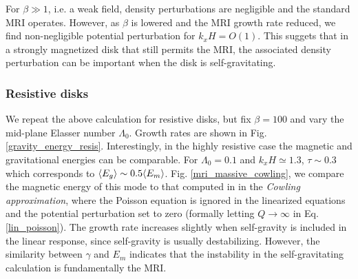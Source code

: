 For $\beta\gg 1$, i.e. a weak field, density perturbations are
negligible and the standard MRI operates. However, as $\beta$ is
lowered and the MRI growth rate reduced, we find non-negligible
potential perturbation for $k_xH=O(1)$. This suggets that in a
strongly magnetized disk that still permits the MRI, the associated
density perturbation can be important when the disk is
self-gravitating. %



  
 

\subsubsection{Resistive disks}
We repeat the above calculation for resistive disks, but fix
$\beta=100$ and vary the mid-plane Elasser number $\Lambda_0$. Growth
rates are shown in Fig. \ref{gravity_energy_resis}. 
Interestingly, in the highly resistive case
the magnetic and gravitational energies can be comparable. For 
$\Lambda_0=0.1$ and $k_xH\simeq1.3$, $\tau\sim 0.3$ which corresponds
to $\langle{E_g}\rangle\sim 0.5\langle{E_m}\rangle$.  
Fig. \ref{mri_massive_cowling}, we compare the magnetic
energy of this mode to that computed in in the \emph{Cowling  
  approximation}, where the Poisson equation is ignored in the 
linearized equations and the potential perturbation set to zero  
(formally letting $Q\to\infty$ in Eq. \ref{lin_poisson}).  
The growth rate increases slightly when self-gravity is included in the linear
response, since self-gravity is usually destabilizing. However, the
similarity between $\gamma$ and $E_m$ indicates that the instability
in the self-gravitating calculation is fundamentally the MRI.   

